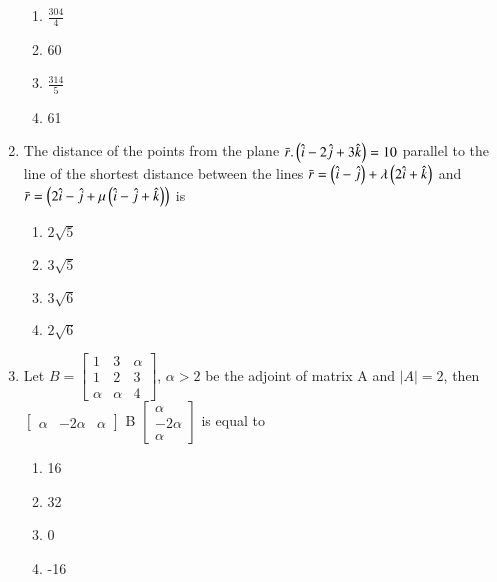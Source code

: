 \documentclass[journal,12pt,onecolumn]{IEEEtran}
\theoremstyle{remark}
\begin{document}
\begin{enumerate}
\begin{enumerate}
    \item $\frac{304}{4}$
    \item 60
    \item $\frac{314}{5}$
    \item 61
\end{enumerate}
\item The distance of the points  from the plane $\bar{r}.\left(\hat{i}-2\hat{j}+3\hat{k}\right)=10$ parallel to the line of the shortest distance between the lines $\bar{r}=\left(\hat{i}-\hat{j}\right)+\lambda \left(2\hat{i}+\hat{k}\right)$ and $\bar{r}=\left(2\hat{i}-\hat{j}+\mu \left(\hat{i}-\hat{j}+\hat{k}\right)\right)$ is
\begin{enumerate}
    \item $2\sqrt{5}$
    \item $3\sqrt{5}$
    \item $3\sqrt{6}$
    \item $2\sqrt{6}$
\end{enumerate}
\item Let $B = 
\begin{bmatrix}
1 & 3 & \alpha \\
1 & 2 & 3 \\
\alpha & \alpha & 4
\end{bmatrix}$, $\alpha>2$ be the adjoint of matrix A and $|A|=2$, then $\begin{bmatrix}
    \alpha & -2\alpha & \alpha 
    \end{bmatrix}$ B 
    $\begin{bmatrix}
        \alpha\\
        -2\alpha\\
        \alpha
    \end{bmatrix}$ is equal to
    \begin{enumerate}
        \item 16
        \item 32
        \item 0
        \item -16
    \end{enumerate}
\end{enumerate}
\end{document}
